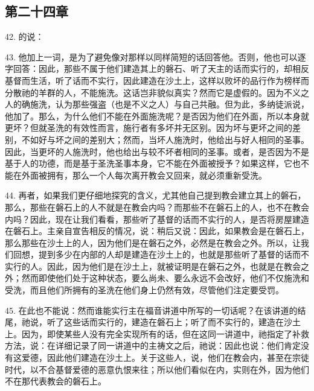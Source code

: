 \subsection{第二十四章}

42. 的说：\par

43. 他加上一词，是为了避免像对那样以同样简短的话回答他。否则，他也可以逐字回答：因此，那些不属于他们建造其上的磐石、听了天主的话而实行的，却相反基督而生活，听了话而不实行，因此建造在沙土上，这样以败坏的品行作为榜样而分散祂的羊群的人，不能施洗。这话岂非貌似真实？然而它是虚假的。因为不义之人的确施洗，认为那些强盗（也是不义之人）与自己共融。但为此，多纳徒派说，他加了。那么，为什么他们不能在外面施洗呢？是否因为他们在外面，所以本身就更坏？但就圣洗的有效性而言，施行者有多坏并无区别。因为坏与更坏之间的差别，不如好与坏之间的差别大；然而，当坏人施洗时，他给出与好人相同的圣事。因此，当更坏的人施洗时，他也给出与较不坏者相同的圣事。或者，是否因为不是基于人的功德，而是基于圣洗圣事本身，它不能在外面被授予？如果这样，它也不能在外面被拥有，那么一个人每次离开教会又回来，就必须重新受洗。\par

44. 再者，如果我们更仔细地探究的含义，尤其他自己提到教会建立其上的磐石，那么，那些在磐石上的人不就是在教会内吗？而那些不在磐石上的人，也不在教会内吗？因此，现在让我们看看，那些听了基督的话而不实行的人，是否将房屋建造在磐石上。主亲自宣告相反的情况，说：稍后又说：因此，如果教会是在磐石上，那么那些在沙土上的人，因为他们是在磐石之外，必然是在教会之外。所以，让我们回想，提到多少在内部的人却是建造在沙土上的，也就是那些听了基督的话而不实行的人。因此，因为他们是在沙土上，就被证明是在磐石之外，也就是在教会之外；然而即使他们处于这种状态，要么尚未、要么永远不会改好，他们不仅施洗和受洗，而且他们所拥有的圣洗在他们身上仍然有效，尽管他们注定要受罚。\par

45. 在此也不能说：然而谁能实行主在福音讲道中所写的一切话呢？在该讲道的结尾，祂说，听了这些话而实行的，建造在磐石上；听了而不实行的，建造在沙土上。因为，即使某些人没有完全实现所有的话，但在这同一讲道中，祂指定了补救方法，说：在详细记录了同一讲道中的主祷文之后，祂说：因此也说：他们肯定没有这爱德，因此他们建造在沙土上。关于这些人，说，他们在教会内，甚至在宗徒时代，以不合基督爱德的恶意仇恨来往；所以他们看似在内，实则在外，因为他们不在那代表教会的磐石上。\par

